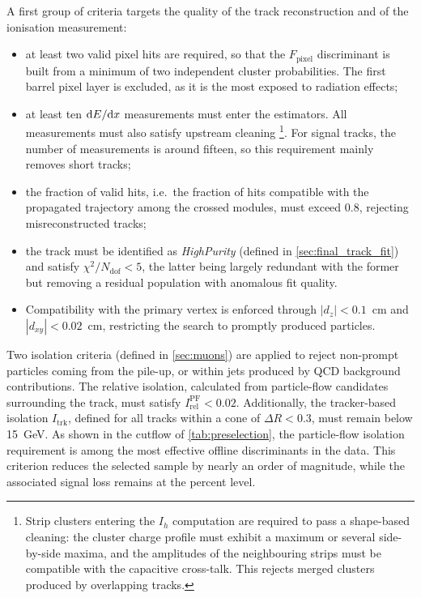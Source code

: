 \vspace{0.5 cm}

A first group of criteria targets the quality of the track reconstruction and of the ionisation measurement:
\begin{itemize}
  \item at least two valid pixel hits are required, so that the $F_\textrm{pixel}$ discriminant is built from a minimum of two independent cluster probabilities. The first barrel pixel layer is excluded, as it is the most exposed to radiation effects;
  \item at least ten $\mathrm{d}E/\mathrm{d}x$ measurements must enter the estimators. All measurements must also satisfy upstream cleaning \footnote{Strip clusters entering the $I_h$ computation are required to pass a shape-based cleaning: the cluster charge profile must exhibit a maximum or several side-by-side maxima, and the amplitudes of the neighbouring strips must be compatible with the capacitive cross-talk. This rejects merged clusters produced by overlapping tracks.}. For signal tracks, the number of measurements is around fifteen, so this requirement mainly removes short tracks;
  \item the fraction of valid hits, i.e.\ the fraction of hits compatible with the propagated trajectory among the crossed modules, must exceed 0.8, rejecting misreconstructed tracks;
  \item the track must be identified as \textit{HighPurity} (defined in \cref{sec:final_track_fit}) and satisfy $\chi^{2}/N_{\mathrm{dof}} < 5$, the latter being largely redundant with the former but removing a residual population with anomalous fit quality.
  \item Compatibility with the primary vertex is enforced through $|d_{z}| < 0.1$~cm and $|d_{xy}| < 0.02$~cm, restricting the search to promptly produced particles.
\end{itemize}

\vspace{0.5 cm}

Two isolation criteria (defined in \cref{sec:muons}) are applied to reject non-prompt particles coming from the pile-up, or within jets produced by QCD background contributions. The relative isolation, calculated from particle-flow candidates surrounding the track, must satisfy $I_\textrm{rel}^\textrm{PF} < 0.02$. Additionally, the tracker-based isolation $I_\textrm{trk}$, defined for all tracks within a cone of $\Delta R < 0.3$, must remain below 15~GeV. As shown in the cutflow of \cref{tab:preselection}, the particle-flow isolation requirement is among the most effective offline discriminants in the data. This criterion reduces the selected sample by nearly an order of magnitude, while the associated signal loss remains at the percent level.

